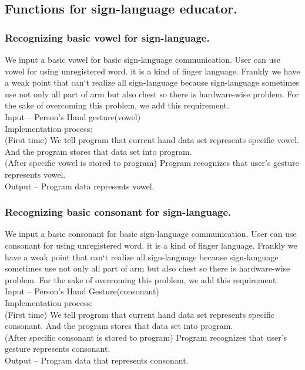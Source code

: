 \documentclass[10pt,journal,compsoc]{IEEEtran}
\begin{document}
\subsection{Functions for sign-language educator.\\}


\subsubsection{Recognizing basic vowel for sign-language.}

We input a basic vowel for basic sign-language communication. User can use vowel for using unregistered word. it is a kind of finger language. Frankly we have a weak point that can`t realize all sign-language because sign-language sometimes use not only all part of arm but also chest so there is hardware-wise problem. For the sake of overcoming this problem, we add this requirement.
\\Input – Person's Hand gesture(vowel)
\\Implementation process:
\\(First time) We tell program that current hand data set represents specific vowel. And the program stores that data set into program.
\\(After specific vowel is stored to program) Program recognizes that user’s gesture represents vowel.
\\Output – Program data represents vowel.

\subsubsection{Recognizing basic consonant for sign-language.}

We input a basic consonant for basic sign-language communication. User can use consonant for using unregistered word. it is a kind of finger language. Frankly we have a weak point that can`t realize all sign-language because sign-language sometimes use not only all part of arm but also chest so there is hardware-wise problem. For the sake of overcoming this problem, we add this requirement.
\\Input – Person's Hand Gesture(consonant)
\\Implementation process:
\\(First time) We tell program that current hand data set represents specific consonant. And the program stores that data set into program.
\\(After specific consonant is stored to program) Program recognizes that user’s gesture represents consonant.
\\Output – Program data that represents consonant.
\end{document}
